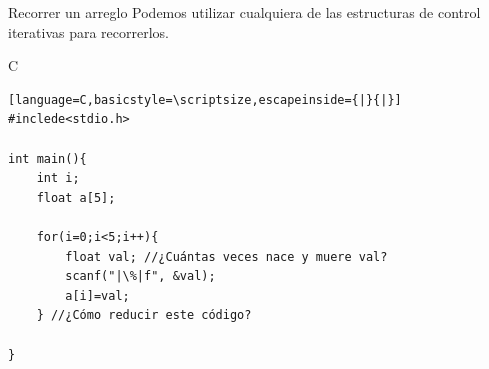 \documentclass{beamer}
\begin{document}
\begin{frame}[fragile]{Recorrer un arreglo}
Podemos utilizar cualquiera de las estructuras de control iterativas para recorrerlos. 
\begin{exampleblock}{C}
\begin{lstlisting}[language=C,basicstyle=\scriptsize,escapeinside={|}{|}]
#inclede<stdio.h>

int main(){
	int i;
	float a[5];
	
	for(i=0;i<5;i++){
		float val; //¿Cuántas veces nace y muere val?
		scanf("|\%|f", &val);
		a[i]=val;
	} //¿Cómo reducir este código?

}
\end{lstlisting}
\end{exampleblock}
\end{frame}




%
\end{document}
